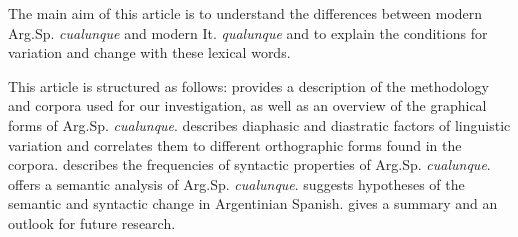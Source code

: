 \documentclass[output=paper,colorlinks,citecolor=brown]{langscibook}
\begin{document}
The main aim of this article is to understand the differences between modern Arg.Sp. \textit{cualunque} and modern It. \textit{qualunque} and to explain the conditions for variation and change with these lexical words.

This article is structured as follows:   provides a description of the methodology and corpora used for our investigation, as well as an overview of the graphical forms of Arg.Sp. \textit{cualunque}.   describes diaphasic and diastratic factors of linguistic variation and correlates them to different orthographic forms found in the corpora.   describes the frequencies of syntactic properties of Arg.Sp. \textit{cualunque}.   offers a semantic analysis of Arg.Sp. \textit{cualunque}.   suggests hypotheses of the semantic and syntactic change in Argentinian Spanish.   gives a summary and an outlook for future research.
\end{document}

